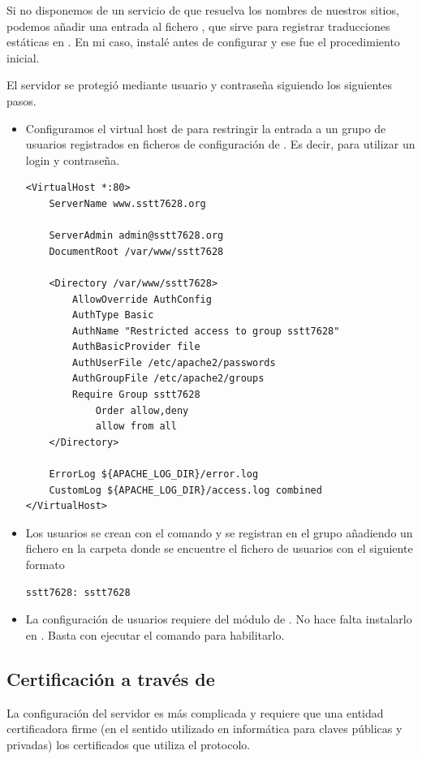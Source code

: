 Si no disponemos de un servicio de {\DNS} que resuelva los nombres de nuestros sitios, podemos añadir una entrada al fichero , que sirve para registrar traducciones estáticas en . En mi caso, instalé  antes de configurar  y ese fue el procedimiento inicial.

El servidor {\HTTP} se protegió mediante usuario y contraseña siguiendo los siguientes pasos.

\begin{itemize}
\item Configuramos el virtual host {\HTTP} de  para restringir la entrada a un grupo de usuarios registrados en ficheros de configuración de . Es decir, para utilizar un login y contraseña.

\begin{lstlisting}[title=Primera parte del fichero \file{/etc/apache2/sites-available/sstt7628.conf}]
<VirtualHost *:80>
	ServerName www.sstt7628.org

	ServerAdmin admin@sstt7628.org
	DocumentRoot /var/www/sstt7628

	<Directory /var/www/sstt7628>
		AllowOverride AuthConfig
		AuthType Basic
		AuthName "Restricted access to group sstt7628"
		AuthBasicProvider file
		AuthUserFile /etc/apache2/passwords
		AuthGroupFile /etc/apache2/groups
		Require Group sstt7628
			Order allow,deny
			allow from all
	</Directory>

	ErrorLog ${APACHE_LOG_DIR}/error.log
	CustomLog ${APACHE_LOG_DIR}/access.log combined
</VirtualHost>
\end{lstlisting}

\item Los usuarios se crean con el comando  y se registran en el grupo añadiendo un fichero  en la carpeta donde se encuentre el fichero de usuarios con el siguiente formato
\begin{lstlisting}[title=Fichero \file{/etc/apache2/groups}]
    sstt7628: sstt7628
\end{lstlisting}

\item La configuración de usuarios requiere del módulo  de . No hace falta instalarlo en . Basta con ejecutar el comando  para habilitarlo.
\end{itemize}


\subsection{Certificación {\HTTPs} a través de }
La configuración del servidor {\HTTPs} es más complicada y requiere que una entidad certificadora firme (en el sentido utilizado en informática para claves públicas y privadas) los certificados que utiliza el protocolo.

